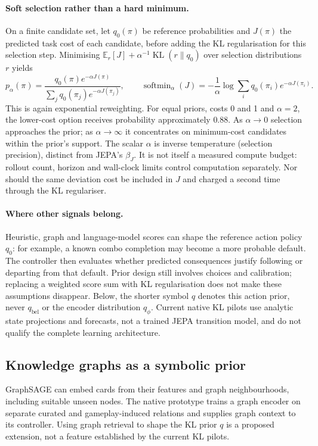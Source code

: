 \documentclass[11pt,a4paper]{article}
\theoremstyle{definition}
\theoremstyle{plain}
\DeclareMathOperator{\KL}{KL}
\begin{document}
\paragraph{Soft selection rather than a hard minimum.} On a finite candidate set, let $q_0(\pi)$ be reference probabilities and $J(\pi)$ the predicted task cost of each candidate, before adding the KL regularisation for this selection step. Minimising $\mathbb E_r[J]+\alpha^{-1}\KL(r\|q_0)$ over selection distributions $r$ yields
\begin{equation}
p_\alpha(\pi)=\frac{q_0(\pi)e^{-\alpha J(\pi)}}
 {\sum_jq_0(\pi_j)e^{-\alpha J(\pi_j)}},
\qquad
\operatorname{softmin}_\alpha(J)
=-\frac{1}{\alpha}\log\sum_iq_0(\pi_i)e^{-\alpha J(\pi_i)}.
\label{eq:gibbs}
\end{equation}
This is again exponential reweighting. For equal priors, costs 0 and 1 and $\alpha=2$, the lower-cost option receives probability approximately $0.88$. As $\alpha\to0$ selection approaches the prior; as $\alpha\to\infty$ it concentrates on minimum-cost candidates within the prior's support. The scalar $\alpha$ is inverse temperature (selection precision), distinct from JEPA's $\beta_J$. It is not itself a measured compute budget: rollout count, horizon and wall-clock limits control computation separately. Nor should the same deviation cost be included in $J$ and charged a second time through the KL regulariser.

\paragraph{Where other signals belong.} Heuristic, graph and language-model scores can shape the reference action policy $q_0$: for example, a known combo completion may become a more probable default. The controller then evaluates whether predicted consequences justify following or departing from that default. Prior design still involves choices and calibration; replacing a weighted score sum with KL regularisation does not make these assumptions disappear. Below, the shorter symbol $q$ denotes this action prior, never $q_{\mathrm{bel}}$ or the encoder distribution $q_\phi$. Current native KL pilots use analytic state projections and forecasts, not a trained JEPA transition model, and do not qualify the complete learning architecture.

\subsection{Knowledge graphs as a symbolic prior}
GraphSAGE \citep{hamilton2017inductive} can embed cards from their features and graph neighbourhoods, including suitable unseen nodes. The native prototype trains a graph encoder on separate curated and gameplay-induced relations and supplies graph context to its controller. Using graph retrieval to shape the KL prior $q$ is a proposed extension, not a feature established by the current KL pilots.
\end{document}
